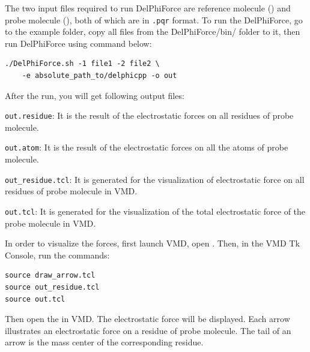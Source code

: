 \documentclass[9pt,tutorial,pubversion]{livecoms}
\newcommand*\ttvar[1]{\texttt{\expandafter\dottvar\detokenize{#1}\relax}}
\newcommand*\dottvar[1]{\ifx\relax#1\else
  \expandafter\ifx\string_#1\string_\allowbreak\else#1\fi
  \expandafter\dottvar\fi}
\begin{document}
The two input files required to run DelPhiForce are reference molecule (\ttvar{file1}) and probe molecule (\ttvar{file2}), both of which are in \texttt{.pqr} format. To run the DelPhiForce, go to the example folder, copy all files from the DelPhiForce/bin/ folder to it, then run DelPhiForce using command below:

\begin{verbatim}
./DelPhiForce.sh -1 file1 -2 file2 \
    -e absolute_path_to/delphicpp -o out
\end{verbatim}

After the run, you will get following output files:

\texttt{out.residue}: It is the result of the electrostatic forces on all residues of probe molecule.

\texttt{out.atom}: It is the result of the electrostatic forces on all the atoms of probe molecule.

\texttt{out\_residue.tcl}: It is generated for the visualization of electrostatic force on all residues of probe molecule in VMD\cite{humphrey1996vmd}.

\texttt{out.tcl}: It is generated for the visualization of the total electrostatic force of the probe molecule in VMD\cite{humphrey1996vmd}.

In order to visualize the forces, first launch VMD, open \ttvar{file2}. Then, in the VMD Tk Console, run the commands: 

\begin{verbatim}
source draw_arrow.tcl
source out_residue.tcl
source out.tcl
\end{verbatim}

Then open the \ttvar{file1} in VMD. The electrostatic force will be displayed.  Each arrow illustrates an electrostatic force on a residue of probe molecule. The tail of an arrow is the mass center of the corresponding residue. 
\end{document}
